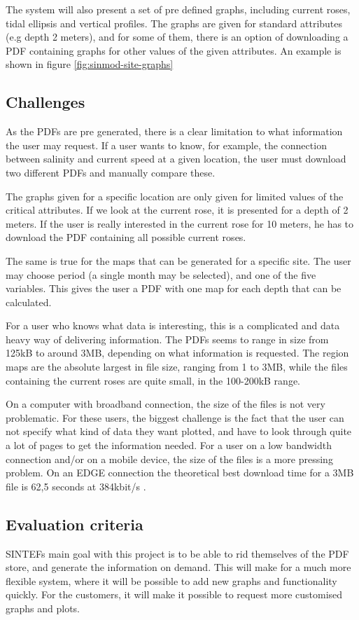 \documentclass[11pt,a4paper,titlepage,oneside]{report}
\begin{document}
The system will also present a set of pre defined graphs, including current roses, tidal ellipsis and vertical profiles. The graphs are given for standard attributes (e.g depth 2 meters), and for some of them, there is an option of downloading a PDF containing graphs for other values of the given attributes. An example is shown in figure \ref{fig:sinmod-site-graphs}


\subsection{Challenges}
As the PDFs are pre generated, there is a clear limitation to what information the user may request. If a user wants to know, for example, the connection between salinity and current speed at a given location, the user must download two different PDFs and manually compare these. 

The graphs given for a specific location are only given for limited values of the critical attributes. If we look at the current rose, it is presented for a depth of 2 meters. If the user is really interested in the current rose for 10 meters, he has to download the PDF containing all possible current roses. 

The same is true for the maps that can be generated for a specific site. The user may choose period (a single month may be selected), and one of the five variables. This gives the user a PDF with one map for each depth that can be calculated. 

For a user who knows what data is interesting, this is a complicated and data heavy way of delivering information. The PDFs seems to range in size from 125kB to around 3MB, depending on what information is requested. The region maps are the absolute largest in file size, ranging from 1 to 3MB, while the files containing the current roses are quite small, in the 100-200kB range. 

On a computer with broadband connection, the size of the files is not very problematic. For these users, the biggest challenge is the fact that the user can not specify what kind of data they want plotted, and have to look through quite a lot of pages to get the information needed. For a user on a low bandwidth connection and/or on a mobile device, the size of the files is a more pressing problem. On an \gls{EDGE} connection the theoretical best download time for a 3MB file is 62,5 seconds at 384kbit/s \cite{3gpp.com}.

\subsection{Evaluation criteria}
SINTEFs main goal with this project is to be able to rid themselves of the PDF store, and generate the information on demand. This will make for a much more flexible system, where it will be possible to add new graphs and functionality quickly. For the customers, it will make it possible to request more customised graphs and plots.
\end{document}

